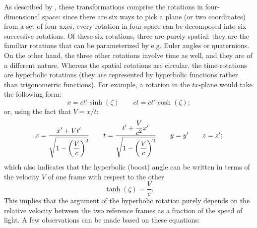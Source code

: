 As described by \citet{Landau1971}, these transformations comprise the rotations in four-dimensional space: since there are six ways to pick a plane (or two coordinates) from a set of four axes, every rotation in four-space can be decomposed into six successive rotations. Of these six rotations, three are purely spatial: they are the familiar rotations that can be parameterized by e.g. Euler angles or quaternions. On the other hand, the three other rotations involve time as well, and they are of a different nature. Whereas the spatial rotations are circular, the time-rotations are hyperbolic rotations (they are represented by hyperbolic functions rather than trigonometric functions). For example, a rotation in the \(tx\)-plane would take the following form:
\begin{equation}
    x = ct'\sinh(\zeta)\qquad ct = ct'\cosh(\zeta);
    \label{eq:lorentz_transform_hyp}
\end{equation}
or, using the fact that \(V = x/t\):
\begin{equation}
    x = \frac{\displaystyle x' + Vt'}{\displaystyle \sqrt{1 - \qty(\frac{V}{c})^2}} 
    \qquad t = \frac{\displaystyle t' + \frac{V}{c^2}x'}{\displaystyle \sqrt{1 - \qty(\frac{V}{c})^2}} \qquad y = y' \qquad z = z';
    \label{eq:lorentz_transform_sqrt}
\end{equation}
which also indicates that the hyperbolic (boost) angle  can be written in terms of the velocity \(V\) of one frame with respect to the other
\[ \tanh(\zeta) = \frac{V}{c}.\]
This implies that the argument of the hyperbolic rotation purely depends on the relative velocity between the two reference frames as a fraction of the speed of light. A few observations can be made based on these equations: 
